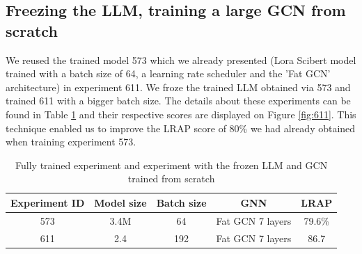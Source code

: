 \subsection*{Freezing the LLM, training a large GCN from scratch}
\label{sec:frozen}
We reused the trained model 573 which we already presented (Lora Scibert model trained with a batch size of 64, a learning rate scheduler and the 'Fat GCN' architecture) in experiment 611. We froze the trained LLM obtained via 573 and trained 611 with a bigger batch size. The details about these experiments can be found in Table \ref{tab:frozen_573} and their respective scores are displayed on Figure \ref{fig:611}. This technique enabled us to improve the LRAP score of 80\%  we had already obtained when training experiment 573. 
\begin{table}[!]
    \centering
    \begin{tabular}{|c|c|c|c|c|}
    \hline
    \textbf{Experiment ID} & \textbf{Model size} & \textbf{Batch size} &\textbf{GNN} & \textbf{LRAP} \\ \hline
    573         & 3.4M & 64    & Fat GCN 7 layers  & 79.6\%      \\ \hline
     611 & 2.4 & 192 & Fat GCN 7 layers & 86.7%
    \end{tabular}
    \caption{Fully trained experiment and experiment with the frozen LLM and GCN trained from scratch}
    \label{tab:frozen_573}
\end{table}

